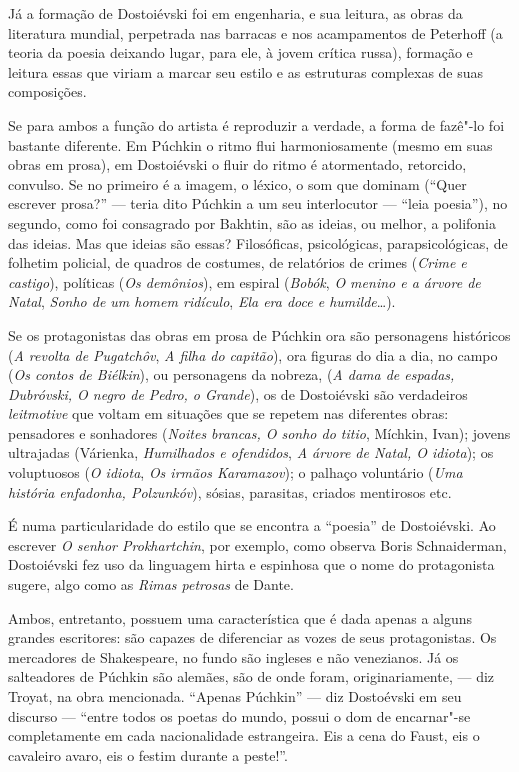 Já a formação de Dostoiévski foi em engenharia, e sua leitura, as obras
da literatura mundial, perpetrada nas barracas e nos acampamentos de
Peterhoff (a teoria da poesia deixando lugar, para ele, à jovem crítica
russa), formação e leitura essas que viriam a marcar seu estilo e as
estruturas complexas de suas composições.

Se para ambos a função do artista é reproduzir a verdade, a forma de
fazê"-lo foi bastante diferente. Em Púchkin o ritmo flui harmoniosamente
(mesmo em suas obras em prosa), em Dostoiévski o fluir do ritmo é
atormentado, retorcido, convulso. Se no primeiro é a imagem, o léxico, o
som que dominam (``Quer escrever prosa?'' --- teria dito Púchkin a um seu
interlocutor --- ``leia poesia''), no segundo, como foi consagrado por
Bakhtin, são as ideias, ou melhor, a polifonia das ideias. Mas que ideias
são essas? Filosóficas, psicológicas, parapsicológicas, de folhetim
policial, de quadros de costumes, de relatórios de crimes (\emph{Crime e
castigo}), políticas (\emph{Os demônios}), em espiral (\emph{Bobók}, \emph{O menino e a árvore de Natal}, \emph{Sonho de um homem ridículo},
\emph{Ela era doce e humilde}\ldots{}).

Se os protagonistas das obras em prosa de Púchkin ora são personagens
históricos (\emph{A revolta de Pugatchôv}, \emph{A filha do capitão}),
ora figuras do dia a dia, no campo (\emph{Os contos de
Biélkin}), ou personagens da nobreza, (\emph{A dama de espadas,
Dubróvski, O negro de Pedro, o Grande}), os de Dostoiévski são
verdadeiros \emph{leitmotive} que voltam em situações que se repetem nas
diferentes obras: pensadores e sonhadores (\emph{Noites brancas, O
sonho do titio}, Míchkin, Ivan); jovens ultrajadas (Várienka,
\emph{Humilhados e ofendidos}, \emph{A árvore de Natal, O idiota}); os
voluptuosos (\emph{O idiota}, \emph{Os irmãos Karamazov}); o palhaço
voluntário (\emph{Uma história enfadonha, Polzunkóv}), sósias,
parasitas, criados mentirosos etc.

É numa particularidade do estilo que se encontra a ``poesia'' de
Dostoiévski. Ao escrever \emph{O senhor Prokhartchin}, por exemplo, como
observa Boris Schnaiderman, Dostoiévski fez uso da linguagem hirta e
espinhosa que o nome do protagonista sugere, algo como as \emph{Rimas
petrosas} de Dante.

Ambos, entretanto, possuem uma característica que é dada apenas a alguns
grandes escritores: são capazes de diferenciar as vozes de seus
protagonistas. Os mercadores de Shakespeare, no fundo são ingleses e não
venezianos. Já os salteadores de Púchkin são alemães, são de onde foram,
originariamente, --- diz Troyat, na obra mencionada. ``Apenas
Púchkin'' --- diz Dostoévski em seu discurso --- ``entre todos os poetas
do mundo, possui o dom de encarnar"-se completamente em cada
nacionalidade estrangeira. Eis a cena do Faust, eis o cavaleiro avaro,
eis o festim durante a peste!''.

